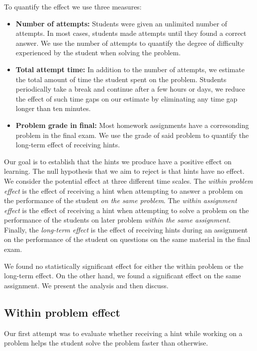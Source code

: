 \documentclass{sigchi}
\begin{document}
To quantify the effect we use three measures:
\begin{itemize}
\item {\bf Number of attempts:} Students were given an unlimited number of attempts. In most cases, students made attempts until they found a correct answer. We use the number of attempts to quantify the degree of difficulty experienced by the student when solving the problem.

\item {\bf Total attempt time:} In addition to the number of attempts, we estimate the total amount of time the student spent on the problem. Students periodically take a break and continue after a few hours or days, we reduce the effect of such time gaps on our estimate by eliminating any time gap longer than ten minutes.
\item {\bf Problem grade in final:} Most homework assignments have a corresonding problem in the final exam. We use the grade of said problem to quantify the long-term effect of receiving hints. 
\end{itemize}

Our goal is to establish that the hints we produce have a positive
effect on learning. The null hypothesis that we aim to reject is that
hints have no effect. We consider the potential effect at three
different time scales. The {\em within problem effect} is the effect
of receiving a hint when attempting to answer a problem on the
performance of the student {\em on the same problem}. The {\em within
  assignment effect} is the effect of receiving a hint when attempting
to solve a problem on the performance of the students on later problem
{\em within the same assignment}. Finally, the {\em long-term effect}
is the effect of receiving hints during an assignment on the
performance of the student on questions on the same material in the
final exam.

We found no statistically significant effect for either the within problem or
the long-term effect. On the other hand, we found a significant effect
on the same assignment. We present the analysis and then discuss.

\subsection{Within problem effect}

Our first attempt was to evaluate whether receiving a hint while
working on a problem helps the student solve the problem faster than
otherwise.
\end{document}
